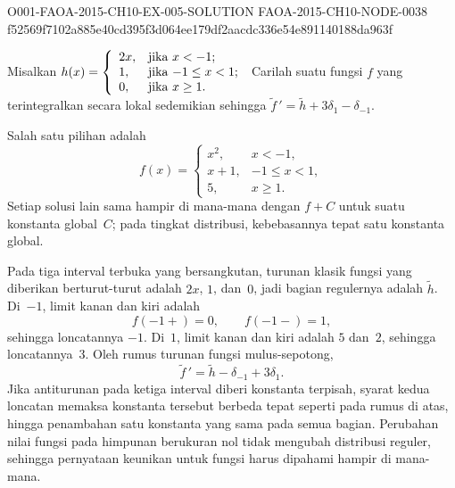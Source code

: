 \begin{o001solution}
  {O001-FAOA-2015-CH10-EX-005-SOLUTION}
  {FAOA-2015-CH10-NODE-0038}
  {f52569f7102a885e40cd395f3d064ee179df2aacdc336e54e891140188da963f}
\begin{o001statement}
Misalkan $h(x) = \left\{
                           \begin{array}{ll}
                             2x, & \hbox{jika $x < -1$;} \\
                             1, & \hbox{jika $-1 \le x < 1$;} \\
                             0, & \hbox{jika $x \ge 1$.}
                           \end{array}
                         \right.$ Carilah suatu fungsi $f$ yang terintegralkan secara lokal sedemikian sehingga ${\tilde f}\,' = \tilde h + 3\delta_1 - \delta_{-1}$.
\end{o001statement}
\begin{o001answer}
Salah satu pilihan adalah
\[
 f(x)=
 \begin{cases}
 x^2,&x<-1,\\
 x+1,&-1\leq x<1,\\
 5,&x\geq1.
 \end{cases}
\]
Setiap solusi lain sama hampir di mana-mana dengan $f+C$ untuk suatu konstanta
global~$C$; pada tingkat distribusi, kebebasannya tepat satu konstanta global.
\end{o001answer}
\begin{o001proof}
Pada tiga interval terbuka yang bersangkutan, turunan klasik fungsi yang
diberikan berturut-turut adalah $2x$, $1$, dan~$0$, jadi bagian regulernya
adalah $\tilde h$. Di~$-1$, limit kanan dan kiri adalah
\[
 f(-1+)=0,
 \qquad
 f(-1-)=1,
\]
sehingga loncatannya $-1$. Di~$1$, limit kanan dan kiri adalah $5$ dan~$2$,
sehingga loncatannya~$3$. Oleh rumus turunan fungsi mulus-sepotong,
\[
 {\tilde f}\,'=\tilde h-\delta_{-1}+3\delta_1.
\]
Jika antiturunan pada ketiga interval diberi konstanta terpisah, syarat kedua
loncatan memaksa konstanta tersebut berbeda tepat seperti pada rumus di atas,
hingga penambahan satu konstanta yang sama pada semua bagian. Perubahan nilai
fungsi pada himpunan berukuran nol tidak mengubah distribusi reguler, sehingga
pernyataan keunikan untuk fungsi harus dipahami hampir di mana-mana.
\end{o001proof}
\end{o001solution}

